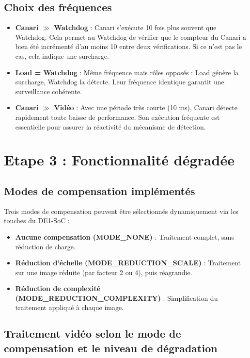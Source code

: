 \documentclass[a4paper,12pt]{article}
\begin{document}
\subsection{Choix des fréquences}

\begin{itemize}
    \item \textbf{Canari $\gg$ Watchdog} : Canari s'exécute 10 fois plus souvent que Watchdog. Cela permet au Watchdog de vérifier que le compteur du Canari a bien été incrémenté d'au moins 10 entre deux vérifications. Si ce n'est pas le cas, cela indique une surcharge.
    \item \textbf{Load = Watchdog} : Même fréquence mais rôles opposés : Load génère la surcharge, Watchdog la détecte. Leur fréquence identique garantit une surveillance cohérente.
    \item \textbf{Canari $\gg$ Vidéo} : Avec une période très courte (10 ms), Canari détecte rapidement toute baisse de performance. Son exécution fréquente est essentielle pour assurer la réactivité du mécanisme de détection.
\end{itemize}

\newpage

\section{Etape 3 : Fonctionnalité dégradée}

\subsection*{Modes de compensation implémentés}

Trois modes de compensation peuvent être sélectionnés dynamiquement via les touches du DE1-SoC :
\begin{itemize}
    \item \textbf{Aucune compensation (MODE\_NONE)} : Traitement complet, sans réduction de charge.
    \item \textbf{Réduction d'échelle (MODE\_REDUCTION\_SCALE)} : Traitement sur une image réduite (par facteur 2 ou 4), puis réagrandie.
    \item \textbf{Réduction de complexité (MODE\_REDUCTION\_COMPLEXITY)} : Simplification du traitement appliqué à chaque image.
\end{itemize}

\subsection{Traitement vidéo selon le mode de compensation et le niveau de dégradation}
\end{document}
